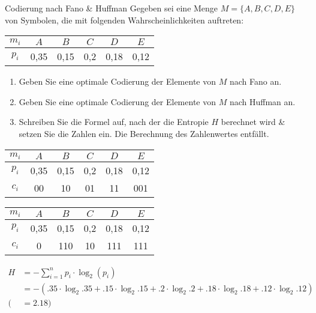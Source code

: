 \documentclass{exercisesheet}
\begin{document}
\begin{exercise*}{Codierung nach Fano \& Huffman}
  Gegeben sei eine Menge $M = \{A, B, C, D, E\}$ von Symbolen, die mit folgenden Wahrscheinlichkeiten auftreten:
  \begin{center}
    \begin{tabular}{c|ccccc}
      $m_i$ & $A$  & $B$  & $C$ & $D$  & $E$  \\
      \hline
      $p_i$ & 0,35 & 0,15 & 0,2 & 0,18 & 0,12 \\
    \end{tabular}
  \end{center}
  \begin{enumerate}
    \item Geben Sie eine optimale Codierung der Elemente von $M$ nach Fano an.
    \item Geben Sie eine optimale Codierung der Elemente von $M$ nach Huffman an.
    \item Schreiben Sie die Formel auf, nach der die Entropie $H$ berechnet wird \& setzen Sie die Zahlen ein. Die Berechnung des Zahlenwertes entfällt.
  \end{enumerate}
\end{exercise*}

\begin{solution}
  \item
  \begin{tabular}{c|ccccc}
    $m_i$ & $A$  & $B$  & $C$ & $D$  & $E$  \\
    \hline
    $p_i$ & 0,35 & 0,15 & 0,2 & 0,18 & 0,12 \\
    $c_i$ & 00   & 10   & 01  & 11   & 001  \\
  \end{tabular}
  \item
  \begin{tabular}{c|ccccc}
    $m_i$ & $A$  & $B$  & $C$ & $D$  & $E$  \\
    \hline
    $p_i$ & 0,35 & 0,15 & 0,2 & 0,18 & 0,12 \\
    $c_i$ & 0    & 110  & 10  & 111  & 111  \\
  \end{tabular}
  \item
  \begin{equation*}
    \begin{split}
      H & = -\sum_{i=1}^{n} p_i \cdot \log_2(p_i)                                                                         \\
        & = -(.35\cdot \log_2{.35}+ .15\cdot \log_2{.15}+ .2\cdot \log_2{.2}+ .18\cdot \log_2{.18}+ .12\cdot \log_2{.12}) \\
      ( & =2.18)
    \end{split}
  \end{equation*}
\end{solution}
\end{document}
